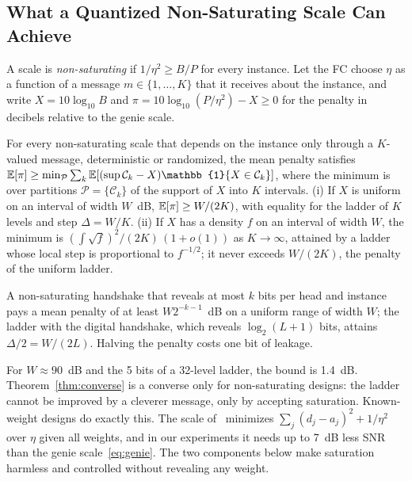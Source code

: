 \subsection{What a Quantized Non-Saturating Scale Can Achieve}

A scale is \emph{non-saturating} if $1/\eta^2\ge B/P$ for every instance. Let the FC choose $\eta$ as a function of a message $m\in\{1,\dots,K\}$ that it receives about the instance, and write $X=10\log_{10}B$ and $\pi=10\log_{10}(P/\eta^2)-X\ge0$ for the penalty in decibels relative to the genie scale.

\begin{theorem}\label{thm:converse}
For every non-saturating scale that depends on the instance only through a $K$-valued message, deterministic or randomized, the mean penalty satisfies $\E[\pi]\ge\min_{\mathcal{P}}\sum_{k}\E[(\sup\mathcal{C}_k-X)\mathbb{1}\{X\in\mathcal{C}_k\}]$, where the minimum is over partitions $\mathcal{P}=\{\mathcal{C}_k\}$ of the support of $X$ into $K$ intervals. (i) If $X$ is uniform on an interval of width $W$~dB, $\mathbb{E}[\pi]\ge W/(2K)$, with equality for the ladder of $K$ levels and step $\Delta=W/K$. (ii) If $X$ has a density $f$ on an interval of width $W$, the minimum is $(\int\!\sqrt{f})^2/(2K)\,(1+o(1))$ as $K\to\infty$, attained by a ladder whose local step is proportional to $f^{-1/2}$; it never exceeds $W/(2K)$, the penalty of the uniform ladder.
\end{theorem}

\begin{corollary}\label{cor:tradeoff}
A non-saturating handshake that reveals at most $k$ bits per head and instance pays a mean penalty of at least $W2^{-k-1}$~dB on a uniform range of width $W$; the ladder with the digital handshake, which reveals $\log_2(L+1)$ bits, attains $\Delta/2=W/(2L)$. Halving the penalty costs one bit of leakage.
\end{corollary}

For $W\approx90$~dB and the 5 bits of a 32-level ladder, the bound is 1.4~dB. Theorem~\ref{thm:converse} is a converse only for non-saturating designs: the ladder cannot be improved by a cleverer message, only by accepting saturation. Known-weight designs do exactly this. The scale of~\cite{yang2026airmoe} minimizes $\sum_j(d_j-a_j)^2+1/\eta^2$ over $\eta$ given all weights, and in our experiments it needs up to 7~dB less SNR than the genie scale~\eqref{eq:genie}. The two components below make saturation harmless and controlled without revealing any weight.

